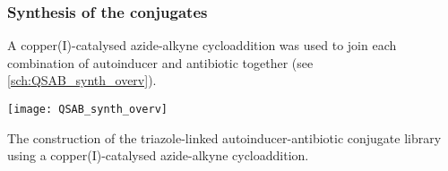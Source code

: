 \subsubsection{Synthesis of the conjugates}

A copper(I)-catalysed azide-alkyne cycloaddition\cite{Tornoe2002,ANIE:ANIE2596} was used to join each combination of autoinducer and antibiotic together (see \ref{sch:QSAB_synth_overv}). 

\begin{scheme}[H]
	\begin{center}
		\texttt{[image: QSAB\_synth\_overv]}
		\caption{The construction of the triazole-linked autoinducer-antibiotic conjugate library using a copper(I)-catalysed azide-alkyne cycloaddition. \label{sch:QSAB_synth_overv}}
	\end{center}
\end{scheme}

